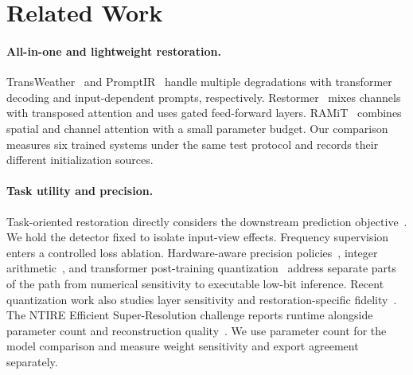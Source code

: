 \section{Related Work}
\paragraph{All-in-one and lightweight restoration.}
TransWeather~\cite{Valanarasu_2022_CVPR} and PromptIR~\cite{NEURIPS2023_e187897e} handle multiple degradations with transformer decoding and input-dependent prompts, respectively. Restormer~\cite{Zamir_2022_CVPR} mixes channels with transposed attention and uses gated feed-forward layers. RAMiT~\cite{Choi_2024_CVPR} combines spatial and channel attention with a small parameter budget. Our comparison measures six trained systems under the same test protocol and records their different initialization sources.

\paragraph{Task utility and precision.}
Task-oriented restoration directly considers the downstream prediction objective~\cite{Chen_2025_CVPR,Gupta_2024_WACV}. We hold the detector fixed to isolate input-view effects. Frequency supervision~\cite{Jiang_2021_FFL} enters a controlled loss ablation. Hardware-aware precision policies~\cite{Wang_2019_HAQ}, integer arithmetic~\cite{Jacob_2018_CVPR}, and transformer post-training quantization~\cite{Yuan_2022_PTQ4ViT,Li_2023_RepQ} address separate parts of the path from numerical sensitivity to executable low-bit inference. Recent quantization work also studies layer sensitivity and restoration-specific fidelity~\cite{Ranjan_2026_MixQViT,Thanh_2026_QATIE,Kim_2026_MPQ}. The NTIRE Efficient Super-Resolution challenge reports runtime alongside parameter count and reconstruction quality~\cite{Ren_2025_CVPRW}. We use parameter count for the model comparison and measure weight sensitivity and export agreement separately.

